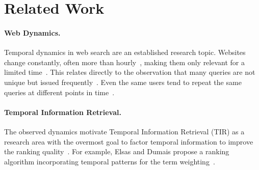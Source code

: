 \section{Related Work}
\label{sec:related-work}

\paragraph{Web Dynamics.} Temporal dynamics in web search are an established research topic. Websites change constantly, often more than hourly~\cite{DBLP:conf/wsdm/AdarTDE09},
making them only relevant for a limited time~\cite{DBLP:conf/sigir/TikhonovBBOKG13}. This relates directly to the observation that many queries are not unique but issued frequently~\cite{DBLP:conf/sigir/Dumais14,DBLP:journals/sigir/SilversteinHMM99}. Even the same users tend to repeat the same queries at different points in time~\cite{DBLP:conf/wsdm/TylerT10}.

\paragraph{Temporal Information Retrieval.} The observed dynamics motivate Temporal Information Retrieval (TIR) as a research area with the overmost goal to factor temporal information to improve the ranking quality~\cite{DBLP:journals/ftir/KanhabuaBN15,DBLP:journals/csur/CamposDJJ14}. For example, Elsas and Dumais propose a ranking algorithm incorporating temporal patterns for the term weighting~\cite{DBLP:conf/wsdm/ElsasD10}.



